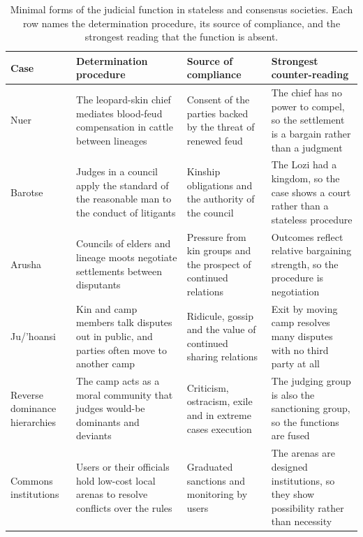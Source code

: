 \documentclass[11pt,letterpaper]{article}
\theoremstyle{definition}
\theoremstyle{remark}
\begin{document}
\begin{table}[t]
\centering
\small
\caption{Minimal forms of the judicial function in stateless and consensus societies. Each row names the determination procedure, its source of compliance, and the strongest reading that the function is absent.}
\label{tab:minimal}
\begin{tabularx}{\textwidth}{L{2.3cm}YYY}
\toprule
Case & Determination procedure & Source of compliance & Strongest counter-reading \\
\midrule
Nuer & The leopard-skin chief mediates blood-feud compensation in cattle between lineages & Consent of the parties backed by the threat of renewed feud & The chief has no power to compel, so the settlement is a bargain rather than a judgment \\
Barotse & Judges in a council apply the standard of the reasonable man to the conduct of litigants & Kinship obligations and the authority of the council & The Lozi had a kingdom, so the case shows a court rather than a stateless procedure \\
Arusha & Councils of elders and lineage moots negotiate settlements between disputants & Pressure from kin groups and the prospect of continued relations & Outcomes reflect relative bargaining strength, so the procedure is negotiation \\
Ju/'hoansi & Kin and camp members talk disputes out in public, and parties often move to another camp & Ridicule, gossip and the value of continued sharing relations & Exit by moving camp resolves many disputes with no third party at all \\
Reverse dominance hierarchies & The camp acts as a moral community that judges would-be dominants and deviants & Criticism, ostracism, exile and in extreme cases execution & The judging group is also the sanctioning group, so the functions are fused \\
Commons institutions & Users or their officials hold low-cost local arenas to resolve conflicts over the rules & Graduated sanctions and monitoring by users & The arenas are designed institutions, so they show possibility rather than necessity \\
\bottomrule
\end{tabularx}
\end{table}
\end{document}
